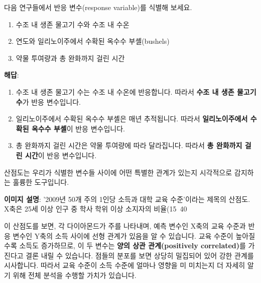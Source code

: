 \documentclass[11pt,a4paper]{article}
\theoremstyle{definition}
\begin{document}
\begin{tcolorbox}[examplebox, title=연습: 반응 변수 선택하기]
다음 연구들에서 반응 변수(response variable)를 식별해 보세요.

\begin{enumerate}[label=\arabic*.]
    \item 수조 내 생존 물고기 수와 수조 내 수온
    \item 연도와 일리노이주에서 수확된 옥수수 부셸(bushels)
    \item 약물 투여량과 총 완화까지 걸린 시간
\end{enumerate}

\textbf{해답}:
\begin{enumerate}[label=\arabic*.]
    \item 수조 내 생존 물고기 수는 수조 내 수온에 반응합니다. 따라서 \textbf{수조 내 생존 물고기 수}가 반응 변수입니다.
    \item 일리노이주에서 수확된 옥수수 부셸은 매년 추적됩니다. 따라서 \textbf{일리노이주에서 수확된 옥수수 부셸}이 반응 변수입니다.
    \item 총 완화까지 걸린 시간은 약물 투여량에 따라 달라집니다. 따라서 \textbf{총 완화까지 걸린 시간}이 반응 변수입니다.
\end{enumerate}
\end{tcolorbox}

\begin{tcolorbox}[infobox, title=산점도 (Scatter Plots)]
산점도는 우리가 식별한 변수들 사이에 어떤 특별한 관계가 있는지 시각적으로 감지하는 훌륭한 도구입니다.

\begin{center}
\end{center}
\textbf{이미지 설명}: '2009년 50개 주의 1인당 소득과 대학 교육 수준'이라는 제목의 산점도. X축은 25세 이상 인구 중 학사 학위 이상 소지자의 비율(15~40%

이 산점도를 보면, 각 다이아몬드가 주를 나타내며, 예측 변수인 X축의 교육 수준과 반응 변수인 Y축의 소득 사이에 선형 관계가 있음을 알 수 있습니다. 교육 수준이 높아질수록 소득도 증가하므로, 이 두 변수는 \textbf{양의 상관 관계(positively correlated)}를 가진다고 결론 내릴 수 있습니다. 점들의 분포를 보면 상당히 밀집되어 있어 강한 관계를 시사합니다. 따라서 교육 수준이 소득 수준에 얼마나 영향을 미 미치는지 더 자세히 알기 위해 전체 분석을 수행할 가치가 있습니다.
\end{tcolorbox}
\end{document}
